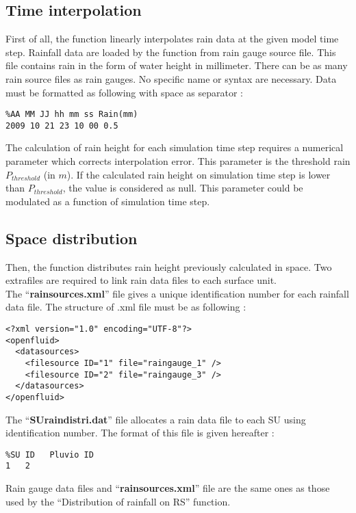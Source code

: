 \subsection{Time interpolation}
First of all, the function linearly interpolates rain data at the given model time step. Rainfall data are loaded by the function from rain gauge source file. This file contains rain in the form of water height in millimeter. There can be as many rain source files as rain gauges. No specific name or syntax are necessary. Data must be formatted as following with space as separator :
\begin{verbatim}
%AA MM JJ hh mm ss Rain(mm)
2009 10 21 23 10 00 0.5
\end{verbatim}

The calculation of rain height for each simulation time step requires a numerical parameter which corrects interpolation error. This parameter is the threshold rain $P_{threshold}$ (in $m$). If the calculated rain height on simulation time step is lower than $P_{threshold}$, the value is considered as null. This parameter could be modulated as a function of simulation time step.


\subsection{Space distribution}
Then, the function distributes rain height previously calculated in space. Two extrafiles are required to link rain data files to each surface unit.\\

The ``\textbf{rainsources.xml}'' file gives a unique identification number for each rainfall data file. The structure of .xml file must be as following :
\begin{verbatim}
<?xml version="1.0" encoding="UTF-8"?>
<openfluid>
  <datasources>
    <filesource ID="1" file="raingauge_1" />
    <filesource ID="2" file="raingauge_3" />
  </datasources>
</openfluid>
\end{verbatim}

The ``\textbf{SUraindistri.dat}'' file allocates a rain data file to each SU using identification number. The format of this file is given hereafter :
\vspace{-3.5mm}
\begin{verbatim}
%SU ID   Pluvio ID
1   2
\end{verbatim}

Rain gauge data files and ``\textbf{rainsources.xml}'' file are the same ones as those used by the ``Distribution of rainfall on RS'' function.
